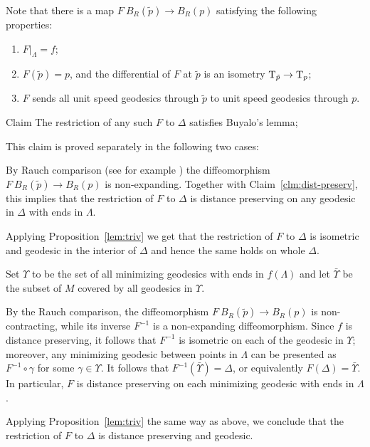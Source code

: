 \documentclass[oneside,a4paper]{article}
\begin{document}
Note that there is a map  $F\:B_R(\tilde p)\to B_R(p)$ satisfying
the following properties:
\begin{enumerate}
\item $F|_\Lambda=f$;
\item $F(\tilde p)=p$,
and the differential of $F$ at $\tilde p$ is an isometry $\mathrm{T}_{\tilde p}\to \mathrm{T}_p$;
\item $F$ sends all unit speed geodesics through $\tilde p$ to unit speed geodesics through $p$.
\end{enumerate}

\begin{thm}{Claim}
The restriction of any such $F$ to $\Delta$ satisfies Buyalo's lemma;
\end{thm}

This claim is proved separately in the following two cases:

By Rauch comparison (see for example \cite[Corollary 1.35]{cheeger-ebin})
the diffeomorphism
$F\:B_R(\tilde p)\to B_R(p)$
is non-expanding. 
Together with Claim~\ref{clm:dist-preserv},
this implies that
 the restriction of $F$ to $\Delta$ is distance preserving on any geodesic in $\Delta$ with ends in $\Lambda$. 
 
 Applying Proposition~\ref{lem:triv}
we get that the restriction of $F$ to $\Delta$
is isometric and geodesic in the interior of $\Delta$
and hence the same holds on whole $\Delta$.\qeds

Set $\Upsilon$ to be the set of all minimizing geodesics with ends in $f(\Lambda)$
and let $\bar \Upsilon$ be the subset of $M$ covered by all geodesics in $\Upsilon$.

By the Rauch comparison, the diffeomorphism $F\:B_R(\tilde p)\to B_R(p)$ is non-contracting,
while its inverse $F^{-1}$ is a non-expanding diffeomorphism.
Since $f$ is distance preserving, it follows that $F^{-1}$ is isometric on each of the geodesic in $\Upsilon$;
moreover, any minimizing geodesic between points in $\Lambda$ can be presented as $F^{-1}\circ\gamma$ for some $\gamma\in \Upsilon$.
It follows that $F^{-1}(\bar \Upsilon)=\Delta$, or equivalently $F(\Delta)=\bar\Upsilon$.
In particular, $F$ is distance preserving on each minimizing geodesic with ends in $\Lambda$.

Applying Proposition~\ref{lem:triv} the same way as above,
we conclude that  the restriction of $F$ to $\Delta$
is distance preserving and geodesic.\qeds
\end{document}

